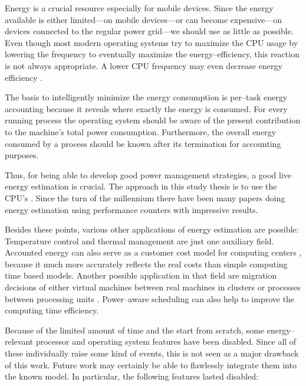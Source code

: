 
Energy is a crucial resource especially for mobile devices. Since the energy
available is either limited---on mobile devices---or can become expensive---on
devices connected to the regular power grid---we should use as little as
possible. Even though most modern operating systems try to maximize the CPU
usage by lowering the frequency \cite{snowdon2010operating} to eventually
maximize the energy--efficiency, this reaction is not always appropriate. A
lower CPU frequency may even decrease energy efficiency
\cite{weissel2002process,snowdon2010operating}.

The basis to intelligently minimize the energy consumption is per--task energy
accounting because it reveals where exactly the energy is consumed. For every
running process the operating system should be aware of the present contribution
to the machine's total power consumption. Furthermore, the overall energy
consumed by a process should be known after its termination for accounting
purposes.

Thus, for being able to develop good power management strategies, a good live
energy estimation is crucial. The approach in this study thesis is to use the
CPU's . Since the turn of the millennium
\cite{bellosa2000benefits} there have been many papers
\cite{Bertran2010,bertran2010decomposable,kellner03tempcontrol,isci2003runtime,
weissel2002process} doing energy estimation using performance counters with
impressive results.

Besides these points, various other applications of energy estimation are
possible: Temperature control \cite{kellner03tempcontrol} and thermal management
\cite{merkel05tmsmpsys} are just one auxiliary field. Accounted energy can also
serve as a customer cost model for computing centers \cite{Bertran2010}, because
it much more accurately reflects the real costs than simple computing time based
models. Another possible application in that field are migration decisions of
either virtual machines between real machines in clusters or processes between
processing units \cite{merkel10rcscheduling}. Power--aware scheduling can also
help to improve the computing time efficiency.


\label{sec:restrictions}

Because of the limited amount of time and the start from scratch, some
energy--relevant processor and operating system features have been disabled.
Since all of these individually raise some kind of events, this is not seen as a
major drawback of this work.  Future work may certainly be able to flawlessly
integrate them into the known model. In particular, the following features
lasted disabled:


